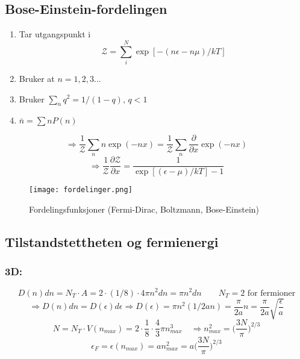 \documentclass{article}
\begin{document}
\begin{multicols}{2}
\subsection*{Bose-Einstein-fordelingen}
\begin{enumerate}
\item Tar utgangspunkt i $$\mathcal{Z}=\sum_i^N\exp[-(n\epsilon-n\mu)/kT]$$
\item Bruker at $n=1,2,3...$
\item Bruker $\sum_nq^2=1/(1-q),\, q<1$
\item $\bar{n}=\sum nP(n)$
\end{enumerate}
$$\Rightarrow \frac{1}{\mathcal{Z}}\sum_n n\exp(-nx)=\frac{1}{\mathcal{Z}}\sum_n\frac{\partial}{\partial x}\exp(-nx)$$
$$\Rightarrow \frac{1}{\mathcal{Z}}\frac{\partial\mathcal{Z}}{\partial x}=\frac{1}{\exp[(\epsilon-\mu)/kT]-1}$$
\end{multicols}

\begin{figure}%
    \centering
    \qquad
\end{figure}

\begin{figure}[h]
\centering
\texttt{[image: fordelinger.png]}
\caption{Fordelingsfunksjoner (Fermi-Dirac, Boltzmann, Bose-Einstein)}
\end{figure}
\subsection*{Tilstandstettheten og fermienergi}
\subsubsection*{3D:}
$$D(n)dn=N_T\cdot A=2\cdot (1/8)\cdot 4\pi n^2dn=\pi n^2dn\qquad N_T=2\text{ for fermioner}$$
$$\Rightarrow D(n)dn=D(\epsilon)d\epsilon\Rightarrow D(\epsilon)=\pi n^2(1/2an)=\frac{\pi}{2a}n=\frac{\pi}{2a}\sqrt{\frac{\epsilon}{a}}$$
$$N=N_T\cdot V(n_{max})=2\cdot\frac{1}{8}\cdot\frac{4}{3}\pi n_{max}^3\quad\Rightarrow n_{max}^2=\bigg(\frac{3N}{\pi}\bigg)^{2/3}$$
$$\epsilon_F=\epsilon(n_{max})=an_{max}^2=a\bigg(\frac{3N}{\pi}\bigg)^{2/3}$$ 
\end{document}
